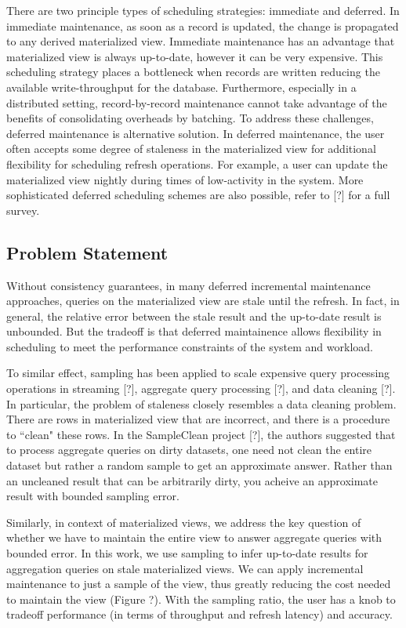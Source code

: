There are two principle types of scheduling strategies: immediate and deferred. 
In immediate maintenance, as soon as a record is updated, 
the change is propagated to any derived materialized view.
Immediate maintenance has an advantage that materialized view is always up-to-date, 
however it can be very expensive.
This scheduling strategy places a bottleneck when records are written reducing 
the available write-throughput for the database.
Furthermore, especially in a distributed setting, record-by-record 
maintenance cannot take advantage of the benefits of consolidating overheads by batching.
To address these challenges, deferred maintenance is alternative solution.
In deferred maintenance, the user often accepts some degree of staleness in 
the materialized view for additional flexibility for scheduling refresh operations.
For example, a user can update the materialized view 
nightly during times of low-activity in the system.
More sophisticated deferred scheduling schemes are also possible, refer to [?] for a full survey.

\subsection{Problem Statement}
Without consistency guarantees, in many deferred incremental maintenance approaches, 
queries on the materialized view are stale until the refresh.
In fact, in general, the relative error between the stale result and the up-to-date result is unbounded.
But the tradeoff is that deferred maintainence allows flexibility in scheduling to meet the performance constraints
of the system and workload.

To similar effect, sampling has been applied to scale expensive query processing operations in streaming [?], 
aggregate query processing [?], and data cleaning [?].
In particular, the problem of staleness closely resembles a data cleaning problem.
There are rows in materialized view that are incorrect, and there is a procedure to ``clean" these rows.
In the SampleClean project [?], the authors suggested that to process aggregate queries on dirty datasets, 
one need not clean the entire dataset but rather a random sample to get an approximate answer.
Rather than an uncleaned result that can be arbitrarily dirty, you acheive an approximate result with bounded sampling error. 

Similarly, in context of materialized views, we address the key question of whether we have to maintain the entire 
view to answer aggregate queries with bounded error.
In this work, we use sampling to infer up-to-date results for aggregation queries on stale materialized views. 
We can apply incremental maintenance to just a sample of the view, thus greatly reducing the cost needed to maintain the view (Figure ?). 
With the sampling ratio, the user has a knob to tradeoff performance (in terms of throughput and refresh latency) and accuracy.

